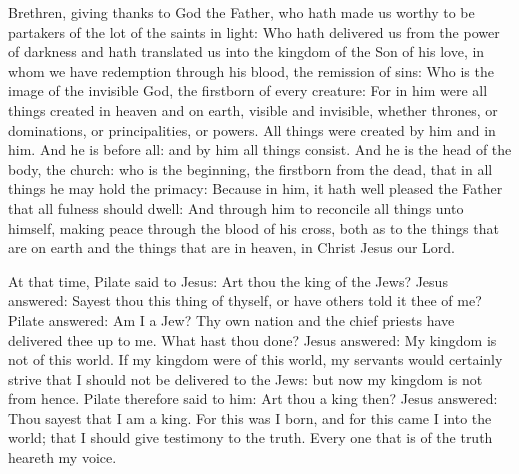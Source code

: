 \bigskip




Brethren, giving thanks to God the Father, who hath made us worthy to be
partakers of the lot of the saints in light:
Who hath delivered us from the power of darkness and hath
translated us into the kingdom of the Son of his love,
in whom we have redemption through his blood, the remission of
sins:
Who is the image of the invisible God, the firstborn of every
creature:
For in him were all things created in heaven and on earth, visible
and invisible, whether thrones, or dominations, or principalities, or
powers. All things were created by him and in him.
And he is before all: and by him all things consist.
And he is the head of the body, the church: who is the beginning,
the firstborn from the dead, that in all things he may hold the primacy:
Because in him, it hath well pleased the Father that all fulness
should dwell:
And through him to reconcile all things unto himself, making peace
through the blood of his cross, both as to the things that are on earth
and the things that are in heaven, in Christ Jesus our Lord.

\bigskip


At that time, Pilate %
said to Jesus: Art thou the king of the Jews?
Jesus answered: Sayest thou this thing of thyself, or have others
told it thee of me?
Pilate answered: Am I a Jew? Thy own nation and the chief priests
have delivered thee up to me. What hast thou done?
Jesus answered: My kingdom is not of this world. If my kingdom
were of this world, my servants would certainly strive that I should not
be delivered to the Jews: but now my kingdom is not from hence.
Pilate therefore said to him: Art thou a king then? Jesus
answered: Thou sayest that I am a king. For this was I born, and for
this came I into the world; that I should give testimony to the truth.
Every one that is of the truth heareth my voice.


\bigskip

